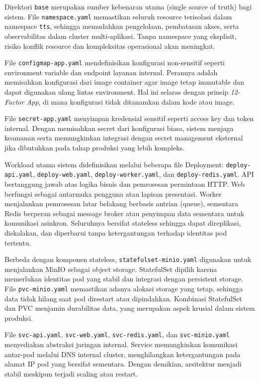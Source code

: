 Direktori \texttt{base} merupakan sumber kebenaran utama (single source of truth) bagi sistem. File \texttt{namespace.yaml} memastikan seluruh resource terisolasi dalam namespace \texttt{tts}, sehingga memudahkan pengelolaan, pembatasan akses, serta observabilitas dalam cluster multi-aplikasi. Tanpa namespace yang eksplisit, risiko konflik resource dan kompleksitas operasional akan meningkat.

File \texttt{configmap-app.yaml} mendefinisikan konfigurasi non-sensitif seperti environment variable dan endpoint layanan internal. Perannya adalah memisahkan konfigurasi dari image container agar image tetap immutable dan dapat digunakan ulang lintas environment. Hal ini selaras dengan prinsip \textit{12-Factor App}, di mana konfigurasi tidak ditanamkan dalam kode atau image.

File \texttt{secret-app.yaml} menyimpan kredensial sensitif seperti access key dan token internal. Dengan memisahkan secret dari konfigurasi biasa, sistem menjaga keamanan serta memungkinkan integrasi dengan secret management eksternal jika dibutuhkan pada tahap produksi yang lebih kompleks.

Workload utama sistem didefinisikan melalui beberapa file Deployment: \texttt{deploy-api.yaml}, \texttt{deploy-web.yaml}, \texttt{deploy-worker.yaml}, dan \texttt{deploy-redis.yaml}. API bertanggung jawab atas logika bisnis dan pemrosesan permintaan HTTP. Web berfungsi sebagai antarmuka pengguna atau lapisan presentasi. Worker menjalankan pemrosesan latar belakang berbasis antrian (queue), sementara Redis berperan sebagai message broker atau penyimpan data sementara untuk komunikasi asinkron. Seluruhnya bersifat stateless sehingga dapat direplikasi, diskalakan, dan diperbarui tanpa ketergantungan terhadap identitas pod tertentu.

Berbeda dengan komponen stateless, \texttt{statefulset-minio.yaml} digunakan untuk menjalankan MinIO sebagai object storage. StatefulSet dipilih karena memerlukan identitas pod yang stabil dan integrasi dengan persistent storage. File \texttt{pvc-minio.yaml} memastikan adanya alokasi storage yang tetap, sehingga data tidak hilang saat pod direstart atau dipindahkan. Kombinasi StatefulSet dan PVC menjamin durabilitas data, yang merupakan aspek krusial dalam sistem produksi.

File \texttt{svc-api.yaml}, \texttt{svc-web.yaml}, \texttt{svc-redis.yaml}, dan \texttt{svc-minio.yaml} menyediakan abstraksi jaringan internal. Service memungkinkan komunikasi antar-pod melalui DNS internal cluster, menghilangkan ketergantungan pada alamat IP pod yang bersifat sementara. Dengan demikian, arsitektur menjadi stabil meskipun terjadi scaling atau restart.

